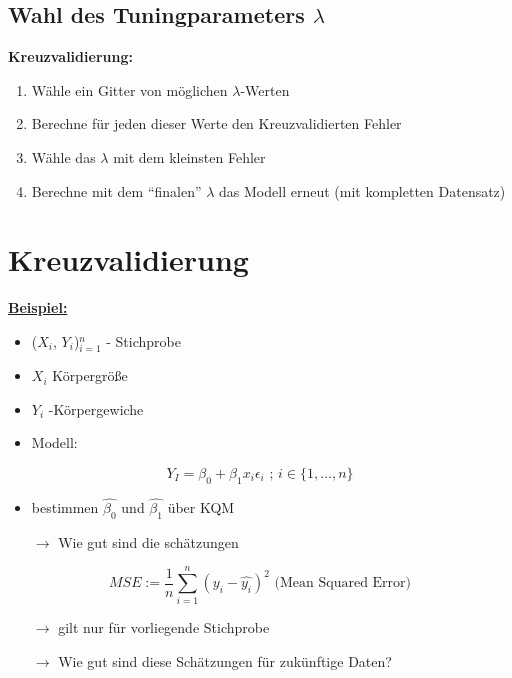 
\subsection{Wahl des Tuningparameters $\lambda$}
\textbf{Kreuzvalidierung:}
\begin{enumerate}
	\item Wähle ein Gitter von möglichen $\lambda$-Werten
	\item Berechne für jeden dieser Werte den Kreuzvalidierten Fehler
	\item Wähle das \(\lambda\) mit dem kleinsten Fehler
	\item Berechne mit dem "`finalen"' \( \lambda \) das Modell erneut (mit kompletten Datensatz)
\end{enumerate}


\section{Kreuzvalidierung}
\textbf{\underline{Beispiel:}}
	\begin{itemize}
		\item ($X_i$, $Y_i$)$_{i=1}^n$ - Stichprobe
		\item $X_i$ Körpergröße
		\item $Y_i$ -Körpergewiche
		\item Modell: 
	\end{itemize}
		\[Y_I = \beta_0 + \beta_1 x_i\epsilon_i \text{ ; } i \in \{1, \ldots,n\}\]
\begin{itemize}
\item bestimmen $\hat{\beta_0}$ und $\hat{\beta_1}$ über KQM
\item [\(\rightarrow\)] Wie gut sind die schätzungen
\end{itemize}


\[ MSE := \frac{1}{n} \sum_{i = 1}^{n} (y_i - \hat{y_i})^2 \text{  (Mean Squared Error)}\]

\begin{itemize}
	\item[\( \rightarrow \)] gilt nur für vorliegende Stichprobe
	\item[\( \rightarrow \)] Wie gut sind diese Schätzungen für zukünftige Daten?
\end{itemize}

